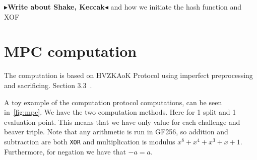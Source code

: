 \documentclass[twoside,11pt]{report}
\theoremstyle{definition}
\theoremstyle{plain}
\newcommand{\todo}[1]{{\color[rgb]{.5,0,0}\textbf{$\blacktriangleright$#1$\blacktriangleleft$}}}
\begin{document}
\todo{Write about Shake, Keccak} and how we initiate the hash function and XOF

\section{MPC computation}

The computation is based on HVZKAoK Protocol using imperfect preprocessing and sacrificing. Section 3.3~\cite{baum2020concretely}.

A toy example of the computation protocol computations, can be seen in~\autoref{fig:mpc}. We have the two computation methods. Here for 1 split and 1 evaluation point. This means that we have only value for each challenge and beaver triple. Note that any arithmetic is run in GF256, so addition and subtraction are both \texttt{XOR} and multiplication is modulus $x^8 + x^4 + x^3 + x + 1$. Furthermore, for negation we have that $-a = a$.
\end{document}
